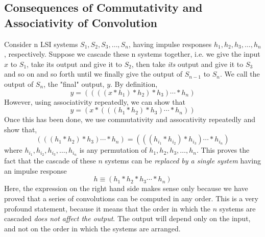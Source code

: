 \subsection{Consequences of Commutativity and Associativity of Convolution}

Consider n LSI systems $S_1,S_2,S_3,\ldots,S_n$, having impulse responses $h_1,h_2,h_3,\ldots,h_n$, respectively. Suppose we cascade these n systems together, i.e. we give the input $x$ to $S_1$, take its output and give it to $S_2$, then take \emph{its} output and give it to $S_3$ and so on and so forth until we finally give the output of $S_{n-1}$ to $S_n$. We call the output of $S_n$, the "final" output,  $y$. By definition, 
\begin{equation}
y = \left(\left(\left(\left(x \ast h_1\right)\ast h_2\right)\ast h_3\right)\cdots\ast h_n\right)
\end{equation}
However, using associativity repeatedly, we can show that
\[y = \left(x \ast \left(\left(\left(h_1\ast h_2\right)\ast h_3\right)\cdots\ast h_n\right)\right)\]
Once this has been done, we use commutativity and assocativity repeatedly and show that, 
\[\left(\left(\left(h_1\ast h_2\right)\ast h_3\right)\cdots\ast h_n\right)=\left(\left(\left(h_{i_1}\ast h_{i_2}\right)\ast h_{i_3}\right)\cdots\ast h_{i_n}\right)\]
where $h_{i_1},h_{i_2},h_{i_3},\ldots ,h_{i_n}$ is any permutation of $h_1,h_2,h_3,\ldots,h_n$. This proves the fact that the cascade of these $n$ systems can be \emph{replaced by a single system} having an impulse response
\begin{equation}
h\equiv \left(h_1\ast h_2 \ast h_3\cdots\ast h_n\right)
\end{equation}
Here, the expression on the right hand side makes sense only because we have proved that a series of convolutions can be computed in any order. This is a very profound statement, because it means that the order in which the $n$ systems are cascaded \emph{does not affect the output}. The output will depend only on the input, and not on the order in which the systems are arranged.

